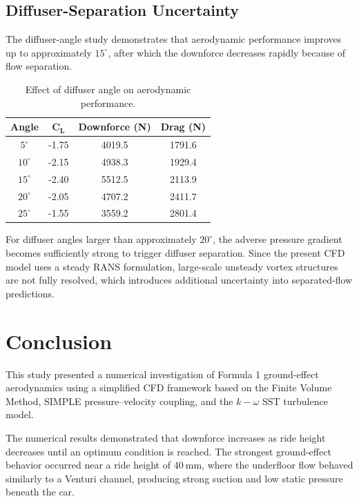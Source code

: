 \documentclass[12pt,a4paper]{article}
\begin{document}
\subsection{Diffuser-Separation Uncertainty}

The diffuser-angle study demonstrates that aerodynamic performance improves up to
approximately \(15^\circ\), after which the downforce decreases rapidly because of flow
separation.

\begin{table}[H]
\centering
\caption{Effect of diffuser angle on aerodynamic performance.}
\begin{tabular}{cccc}
\toprule
\textbf{Angle} & \(\mathbf{C_L}\) & \textbf{Downforce (N)} & \textbf{Drag (N)} \\
\midrule
\(5^\circ\)  & -1.75 & 4019.5 & 1791.6 \\
\(10^\circ\) & -2.15 & 4938.3 & 1929.4 \\
\(15^\circ\) & -2.40 & 5512.5 & 2113.9 \\
\(20^\circ\) & -2.05 & 4707.2 & 2411.7 \\
\(25^\circ\) & -1.55 & 3559.2 & 2801.4 \\
\bottomrule
\end{tabular}
\end{table}

For diffuser angles larger than approximately \(20^\circ\), the adverse pressure gradient
becomes sufficiently strong to trigger diffuser separation. Since the present CFD model
uses a steady RANS formulation, large-scale unsteady vortex structures are not fully
resolved, which introduces additional uncertainty into separated-flow predictions.

\section{Conclusion}

This study presented a numerical investigation of Formula 1 ground-effect aerodynamics
using a simplified CFD framework based on the Finite Volume Method, SIMPLE
pressure--velocity coupling, and the \(k-\omega\) SST turbulence model.

The numerical results demonstrated that downforce increases as ride height decreases
until an optimum condition is reached. The strongest ground-effect behavior occurred
near a ride height of \(40~\text{mm}\), where the underfloor flow behaved similarly to
a Venturi channel, producing strong suction and low static pressure beneath the car.
\end{document}
